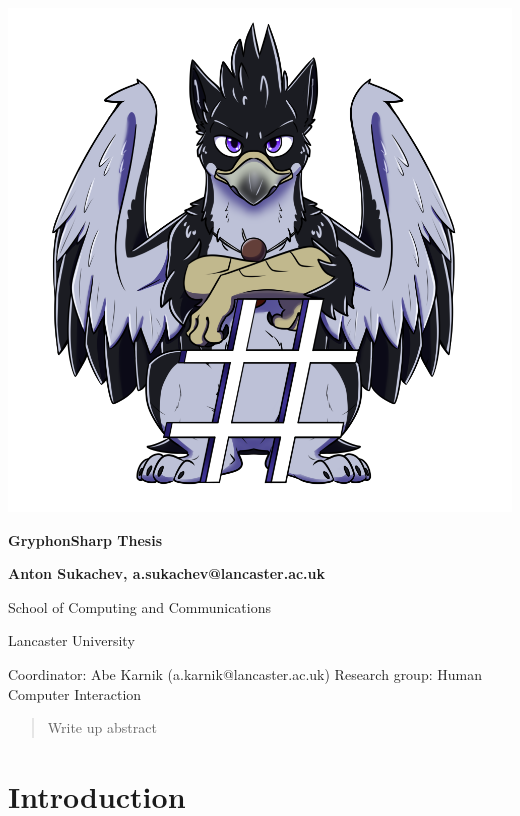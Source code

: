 \documentclass{article}
\begin{document}
\begin{titlepage}

    \center

    \includegraphics[scale=0.5]{AzuGryphonSharp.png} %

    \huge  \textbf{GryphonSharp Thesis}

    \vspace{2cm}

    \Large \textbf{Anton Sukachev, a.sukachev@lancaster.ac.uk}

    School of Computing and Communications

    Lancaster University

    \vfill

    Coordinator: Abe Karnik (a.karnik@lancaster.ac.uk)\endgraf
    Research group: Human Computer Interaction

\end{titlepage}
\pagebreak

\begin{abstract}
    Write up abstract
\end{abstract}

\section{Introduction}
\end{document}
